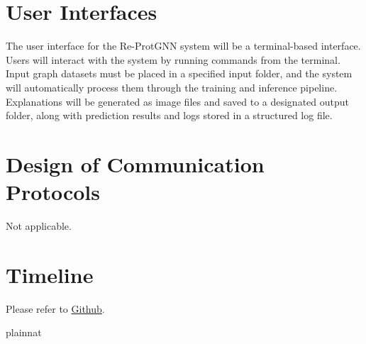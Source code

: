 \documentclass[12pt, titlepage]{article}
\begin{document}

\section{User Interfaces}

The user interface for the Re-ProtGNN system will be a terminal-based interface. Users will interact with the system by running commands from the terminal. Input graph datasets must be placed in a specified input folder, and the system will automatically process them through the training and inference pipeline. Explanations will be generated as image files and saved to a designated output folder, along with prediction results and logs stored in a structured log file.

\section{Design of Communication Protocols}

Not applicable.

\section{Timeline}

Please refer to \href{https://github.com/Yuanqi-X/Re-ProtGNN/tree/main}{Github}.

 {plainnat}

%

\newpage{}
\end{document}
